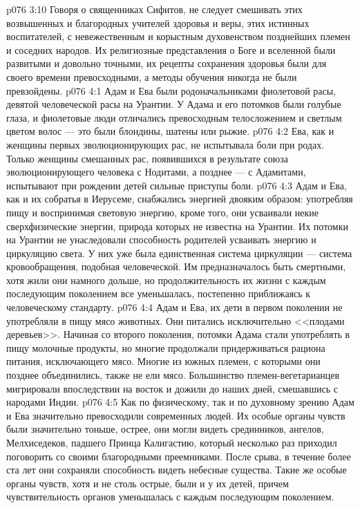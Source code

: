 \vs p076 3:10 Говоря о священниках Сифитов, не следует смешивать этих возвышенных и благородных учителей здоровья и веры, этих истинных воспитателей, с невежественным и корыстным духовенством позднейших племен и соседних народов. Их религиозные представления о Боге и вселенной были развитыми и довольно точными, их рецепты сохранения здоровья были для своего времени превосходными, а методы обучения никогда не были превзойдены.
\vs p076 4:1 Адам и Ева были родоначальниками фиолетовой расы, девятой человеческой расы на Урантии. У Адама и его потомков были голубые глаза, и фиолетовые люди отличались превосходным телосложением и светлым цветом волос --- это были блондины, шатены или рыжие.
\vs p076 4:2 Ева, как и женщины первых эволюционирующих рас, не испытывала боли при родах. Только женщины смешанных рас, появившихся в результате союза эволюционирующего человека с Нодитами, а позднее --- с Адамитами, испытывают при рождении детей сильные приступы боли.
\vs p076 4:3 Адам и Ева, как и их собратья в Иерусеме, снабжались энергией двояким образом: употребляя пищу и воспринимая световую энергию, кроме того, они усваивали некие сверхфизические энергии, природа которых не известна на Урантии. Их потомки на Урантии не унаследовали способность родителей усваивать энергию и циркуляцию света. У них уже была единственная система циркуляции --- система кровообращения, подобная человеческой. Им предназначалось быть смертными, хотя жили они намного дольше, но продолжительность их жизни с каждым последующим поколением все уменьшалась, постепенно приближаясь к человеческому стандарту.
\vs p076 4:4 Адам и Ева, их дети в первом поколении не употребляли в пищу мясо животных. Они питались исключительно <<плодами деревьев>>. Начиная со второго поколения, потомки Адама стали употреблять в пищу молочные продукты, но многие продолжали придерживаться рациона питания, исключающего мясо. Многие из южных племен, с которыми они позднее объединились, также не ели мясо. Большинство племен\hyp{}вегетарианцев мигрировали впоследствии на восток и дожили до наших дней, смешавшись с народами Индии.
\vs p076 4:5 Как по физическому, так и по духовному зрению Адам и Ева значительно превосходили современных людей. Их особые органы чувств были значительно тоньше, острее, они могли видеть срединников, ангелов, Мелхиседеков, падшего Принца Калигастию, который несколько раз приходил поговорить со своими благородными преемниками. После срыва, в течение более ста лет они сохраняли способность видеть небесные существа. Такие же особые органы чувств, хотя и не столь острые, были и у их детей, причем чувствительность органов уменьшалась с каждым последующим поколением.

